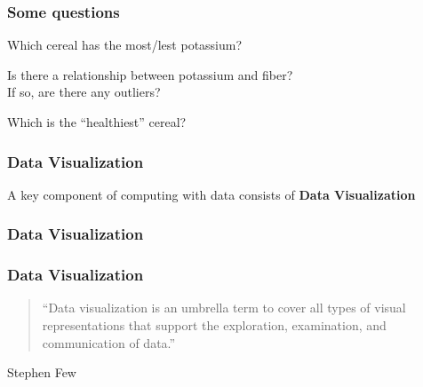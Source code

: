 \documentclass[12pt]{beamer}\usepackage[]{graphicx}\usepackage[]{color}
\begin{document}

\begin{frame}
\frametitle{Some questions}

\bbi
  \item Which cereal has the most/lest potassium?
  \item Is there a relationship between potassium and fiber? \\
  If so, are there any outliers?
  \item Which is the ``healthiest'' cereal?
\ei

\end{frame}


\begin{frame}
\frametitle{Data Visualization}

A key component of computing with data consists of \textbf{Data Visualization}

\end{frame}


\begin{frame}[fragile]
\begin{center}
\end{center}
\end{frame}


\begin{frame}
\frametitle{Data Visualization}
\begin{center}
\end{center}
\end{frame}


\begin{frame}
\frametitle{Data Visualization}

\begin{quotation}
``Data visualization is an umbrella term to cover all types of visual 
representations that support the exploration, examination, and communication
of data.''
\end{quotation}

Stephen Few

\end{frame}
\end{document}
